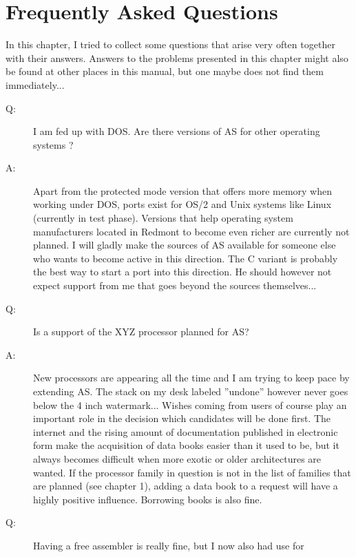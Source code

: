 \documentclass[12pt,twoside]{report}
\begin{document}

\cleardoublepage
\chapter{Frequently Asked Questions}

In this chapter, I tried to collect some questions that arise very often
together with their answers.  Answers to the problems presented in
this chapter might also be found at other places in this manual, but
one maybe does not find them immediately...

\begin{description}
\item[Q:]{I am fed up with DOS.  Are there versions of AS for other
   operating systems ?}
\item[A:]{Apart from the protected mode version that offers more memory when
   working under DOS, ports exist for OS/2 and Unix systems like
   Linux (currently in test phase).  Versions that help operating 
   system manufacturers located in Redmont to become even richer are
   currently not planned.  I will gladly make the sources of AS
   available for someone else who wants to become active in this
   direction.  The C variant is probably the best way to start a
   port into this direction.  He should however not expect support
   from me that goes beyond the sources themselves...}
\vspace{0.3cm}
\item[Q:]{Is a support of the XYZ processor planned for AS?}
\item[A:]{New processors are appearing all the time and I am trying to keep
   pace by extending AS.  The stack on my desk labeled ''undone''
   however never goes below the 4 inch watermark... Wishes coming
   from users of course play an important role in the decision which
   candidates will be done first.  The internet and the rising amount
   of documentation published in electronic form make the acquisition
   of data books easier than it used to be, but it always becomes
   difficult when more exotic or older architectures are wanted.  If
   the processor family in question is not in the list of families
   that are planned (see chapter 1), adding a data book to a request
   will have a highly positive influence.  Borrowing books is also 
   fine.}
\vspace{0.3cm}
\item[Q:]{Having a free assembler is really fine, but I now also had use for
}
\end{description}
\end{document}
